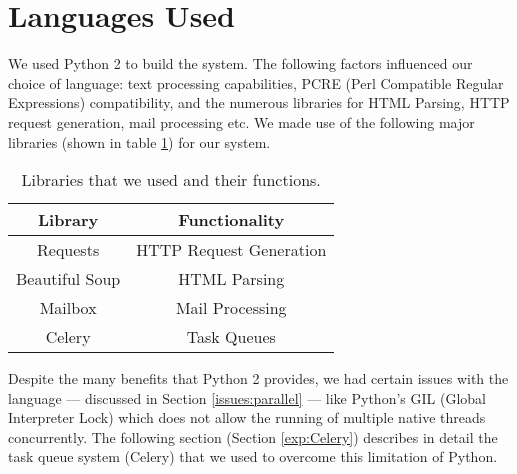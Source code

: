 \section{Languages Used}

We used Python 2 to build the system. The following factors influenced our choice of language: text processing capabilities, PCRE (Perl Compatible Regular Expressions) compatibility, and the numerous libraries for HTML Parsing, HTTP request generation, mail processing etc.
We made use of the following major libraries (shown in table \ref{tab:libs}) for our system.

\begin{table}[!htbp]
	\centering
	\begin{tabular}{|c|c|}
		\hline
		\multicolumn{1}{|c|}{\textbf{Library}} &
		\multicolumn{1}{c|}{\textbf{Functionality}} \\
		\hline
		Requests & HTTP Request Generation\\
		\hline
		Beautiful Soup & HTML Parsing\\
		\hline
		Mailbox & Mail Processing\\
		\hline
		Celery & Task Queues\\
		\hline
	\end{tabular}
	\caption[]{Libraries that we used and their functions.}
	\label{tab:libs}
\end{table}

Despite the many benefits that Python 2 provides, we had certain issues with the language --- discussed in Section \ref{issues:parallel} --- like Python's GIL (Global Interpreter Lock) which does not allow the running of multiple native threads concurrently.
The following section (Section \ref{exp:Celery}) describes in detail the task queue system (Celery) that we used to overcome this limitation of Python.
